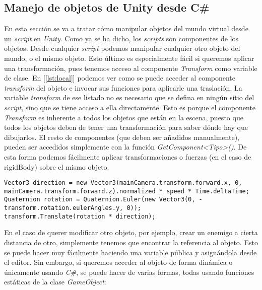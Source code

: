 \documentclass{pre-tfg}
\begin{document}
\subsection{Manejo de objetos de Unity desde C\#}

En esta sección se va a tratar c\'omo manipular objetos del mundo virtual desde un \textit{script} en \textit{Unity}. Como ya se ha dicho, los \textit{scripts} son componentes de los objetos. Desde cualquier \textit{script} podemos manipular cualquier otro objeto del mundo, o el mismo objeto. Esto último es especialmente f\'acil si queremos aplicar una transformación, pues tenemos acceso al componente \textit{Transform} como variable de clase. En [\ref{lst:local}] podemos ver como se puede acceder al componente \textit{transform} del objeto e invocar sus funciones para aplicarle una traslación. La variable \textit{transform} de ese listado no es necesario que se defina en ningún sitio del \textit{script}, sino que se tiene acceso a ella directamente. Esto es porque el componente \textit{Transform} es inherente a todos los objetos que están en la escena, puesto que todos los objetos deben de tener una transformación para saber dónde hay que dibujarlos. El resto de componentes (que deben ser añadidos manualmente), pueden ser accedidos simplemente con la función \textit{GetComponent<Tipo>()}. De esta forma podemos fácilmente aplicar transformaciones o fuerzas (en el caso de rigidBody) sobre el mismo objeto.

\begin{spacing}{1}
\begin{lstlisting}[float=htbp, caption={Acceso al componente transform para modificar el propio objeto}, label=lst:local]
Vector3 direction = new Vector3(mainCamera.transform.forward.x, 0, mainCamera.transform.forward.z).normalized * speed * Time.deltaTime;
Quaternion rotation = Quaternion.Euler(new Vector3(0, -transform.rotation.eulerAngles.y, 0));
transform.Translate(rotation * direction);
\end{lstlisting}
\end{spacing}

En el caso de querer modificar otro objeto, por ejemplo, crear un enemigo a cierta distancia de otro, simplemente tenemos que encontrar la referencia al objeto. Esto se puede hacer muy fácilmente haciendo una variable pública y asignándola desde el editor. Sin embargo, si queremos acceder al objeto de forma dinámica o únicamente usando \textit{C\#}, se puede hacer de varias formas, todas usando funciones estáticas de la clase \textit{GameObject}:
\end{document}
